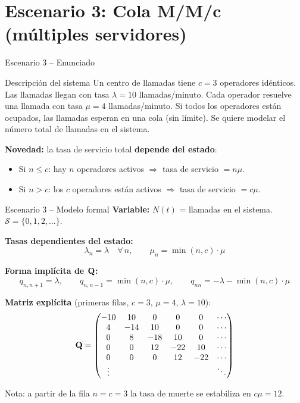 \documentclass[aspectratio=1610, 9pt]{beamer}
\begin{document}
\section{Escenario 3: Cola M/M/c (m\'ultiples servidores)}

\begin{frame}{Escenario 3 -- Enunciado}
\begin{exampleblock}{Descripción del sistema}
Un centro de llamadas tiene $c=3$ operadores id\'enticos. Las llamadas llegan con tasa $\lambda = 10$ llamadas/minuto. Cada operador resuelve una llamada con tasa $\mu = 4$ llamadas/minuto. Si todos los operadores est\'an ocupados, las llamadas esperan en una cola (sin l\'imite). Se quiere modelar el n\'umero total de llamadas en el sistema.
\end{exampleblock}

\vspace{6pt}
\textbf{Novedad:} la tasa de servicio total \textbf{depende del estado}:
\begin{itemize}
    \item Si $n \le c$: hay $n$ operadores activos $\Rightarrow$ tasa de servicio $= n\mu$.
    \item Si $n > c$: los $c$ operadores est\'an activos $\Rightarrow$ tasa de servicio $= c\mu$.
\end{itemize}
\end{frame}

\begin{frame}{Escenario 3 -- Modelo formal}
\textbf{Variable:} $N(t)$ = llamadas en el sistema. \quad $\mathcal{S} = \{0,1,2,\ldots\}$.

\vspace{4pt}
\textbf{Tasas dependientes del estado:}
\[
\lambda_n = \lambda \quad \forall\, n, \qquad \mu_n = \min(n,c)\cdot\mu
\]

\textbf{Forma impl\'icita de $\mathbf{Q}$:}
\[
q_{n,n+1} = \lambda, \qquad q_{n,n-1} = \min(n,c)\cdot\mu, \qquad q_{nn} = -\lambda - \min(n,c)\cdot\mu
\]

\vspace{4pt}
\textbf{Matriz expl\'icita} (primeras filas, $c=3$, $\mu=4$, $\lambda=10$):
\[
\mathbf{Q} = \begin{pmatrix}
-10 & 10 & 0 & 0 & 0 & \cdots \\
4 & -14 & 10 & 0 & 0 & \cdots \\
0 & 8 & -18 & 10 & 0 & \cdots \\
0 & 0 & 12 & -22 & 10 & \cdots \\
0 & 0 & 0 & 12 & -22 & \cdots \\
\vdots &&&& & \ddots
\end{pmatrix}
\]

\small Nota: a partir de la fila $n=c=3$ la tasa de muerte se estabiliza en $c\mu = 12$.
\end{frame}
\end{document}
